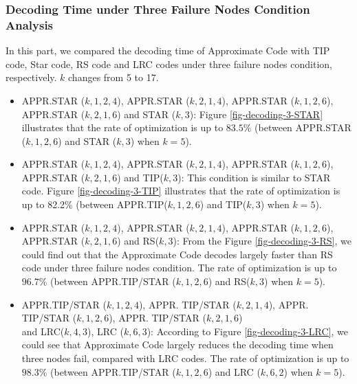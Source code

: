 \documentclass[sigconf]{acmart}
\begin{document}
\subsubsection{Decoding Time under Three Failure Nodes Condition Analysis}
In this part, we compared the decoding time of Approximate Code with TIP code, Star code, RS code and LRC codes under three failure nodes condition, respectively. $k$ changes from 5 to 17.
\begin{itemize}
    \item APPR.STAR ($k,1,2,4$), APPR.STAR ($k,2,1,4$), APPR.STAR ($k,1,2,6$), APPR.STAR ($k,2,1,6$) and STAR ($k,3$): Figure \ref{fig-decoding-3-STAR} illustrates that the rate of optimization is up to $83.5\%$ (between APPR.STAR ($k,1,2,6$) and STAR ($k,3$) when $k = 5$).
    \item APPR.STAR ($k,1,2,4$), APPR.STAR ($k,2,1,4$), APPR.STAR ($k,1,2,6$), APPR.STAR ($k,2,1,6$) and TIP($k,3$): This condition is similar to STAR code. Figure \ref{fig-decoding-3-TIP} illustrates that the rate of optimization is up to 82.2\% (between APPR.TIP($k,1,2,6$) and TIP($k,3$) when $k = 5$).
    \item APPR.STAR ($k,1,2,4$), APPR.STAR ($k,2,1,4$), APPR.STAR ($k,1,2,6$), APPR.STAR ($k,2,1,6$) and RS($k,3$): From the Figure \ref{fig-decoding-3-RS}, we could find out that the Approximate Code decodes largely faster than RS code under three failure nodes condition. The rate of optimization is up to $96.7\%$ (between APPR.TIP/STAR ($k,1,2,6$) and RS($k,3$) when $k = 5$).
    \item APPR.TIP/STAR ($k,1,2,4$), APPR. TIP/STAR ($k,2,1,4$), APPR. TIP/STAR ($k,1,2,6$), APPR. TIP/STAR ($k,2,1,6$)  \\
    and LRC($k,4,3$), LRC ($k,6,3$):
    According to Figure \ref{fig-decoding-3-LRC}, we could see that Approximate Code largely reduces the decoding time when three nodes fail, compared with LRC codes. The rate of optimization is up to $98.3\%$  (between APPR.TIP/STAR ($k,1,2,6$) and LRC ($k, 6, 2$) when $k = 5$).
\end{itemize}
\end{document}
